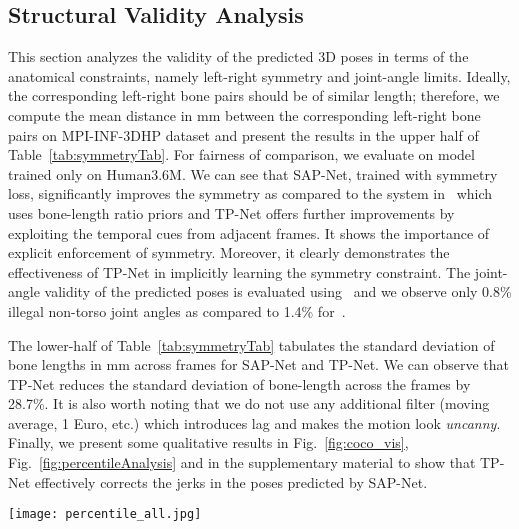 \documentclass[runningheads]{llncs}
\begin{document}
\subsection{Structural Validity Analysis}
This section analyzes the validity of the predicted 3D poses in terms of the anatomical constraints, namely left-right symmetry and joint-angle limits. Ideally, the corresponding left-right bone pairs should be of similar length; therefore, we compute the mean  distance in mm between the corresponding left-right bone pairs on MPI-INF-3DHP dataset and present the results in the upper half of Table~\ref{tab:symmetryTab}. For fairness of comparison, we evaluate on model trained only on Human3.6M. We can see that SAP-Net, trained with symmetry loss, significantly improves the symmetry as compared to the system in~\cite{Zhou_2017_ICCV} which uses bone-length ratio priors and TP-Net offers further improvements by exploiting the temporal cues from adjacent frames. It shows the importance of explicit enforcement of symmetry. Moreover, it clearly demonstrates the effectiveness of TP-Net in implicitly learning the symmetry constraint. The joint-angle validity of the predicted poses is evaluated using~\cite{akhter2015pose} and we observe only 0.8\% illegal non-torso joint angles as compared to 1.4\% for~\cite{Zhou_2017_ICCV}.

The lower-half of Table~\ref{tab:symmetryTab} tabulates the standard deviation of bone lengths in mm across frames for SAP-Net and TP-Net. We can observe that TP-Net reduces the standard deviation of bone-length across the frames by 28.7\%. It is also worth noting that we do not use any additional filter (moving average, 1 Euro, etc.) which introduces lag and makes the motion look \textit{uncanny}. Finally, we present some qualitative results in Fig.~\ref{fig:coco_vis}, Fig.~\ref{fig:percentileAnalysis} and in the supplementary material to show that TP-Net effectively corrects the jerks in the poses predicted by SAP-Net.

\vspace{1.5em}



\begin{figure*}[t]
	\centering
	\texttt{[image: percentile\_all.jpg]}
	\vspace{-2em}
    \caption{Percentile analysis on Human3.6M (top row), MPI-INF-3DHP (middle row) and MPII (bottom row) datasets. The results are displayed at , ,  and  percentile of error (MPJE for Human3.6M and MPI-INF-3DHP, 2D PCK for MPII) from left to right.}
    \label{fig:percentileAnalysis}
    \vspace{-2em}
\end{figure*}
\end{document}
